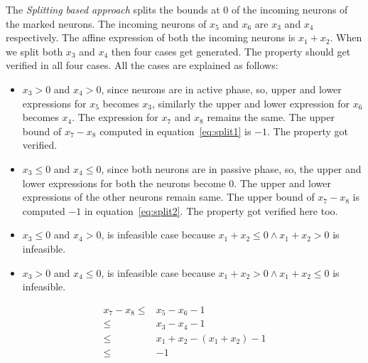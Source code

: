 The {\em Splitting based approach} splits the bounds at $0$ of the incoming neurons of the marked neurons. 
The incoming neurons of $x_5$ and $x_6$ are $x_3$ and $x_4$ respectively. 
The affine expression of both the incoming neurons is $x_1+x_2$. 
When we split both $x_3$ and $x_4$ then four cases get generated. The property should get verified in all four cases. 
All the cases are explained as follows: 
\begin{itemize}
    \item $x_3 > 0$ and $x_4 > 0$, since neurons are in active phase, so, upper and lower expressions for $x_5$ 
    becomes $x_3$, similarly the upper and lower expression for $x_6$ becomes $x_4$. 
    The expression for $x_7$ and $x_8$ remains the same. The upper bound of $x_7 - x_8$ computed in equation~\ref{eq:split1} is $-1$. 
    The property got verified.   
    \item $x_3 \leq 0$ and $x_4 \leq 0$, since both neurons are in passive phase, so, the upper and lower expressions 
        for both the neurons become $0$. The upper and lower expressions of the other neurons remain same. 
        The upper bound of $x_7 - x_8$ is computed $-1$ in equation~\ref{eq:split2}. The property got verified here too. 
    \item $x_3 \leq 0$ and $x_4 > 0$, is infeasible case because $x_1+x_2 \leq 0 \land x_1 + x_2 > 0$ is infeasible. 
    \item $x_3 > 0$ and $x_4 \leq 0$, is infeasible case because $x_1+x_2 > 0 \land x_1 + x_2 \leq 0$ is infeasible. 
\end{itemize}

\begin{equation}
    \begin{aligned}
        x_7 - x_8 \leq & x_5 - x_6 - 1 \\
       \leq & x_3 - x_4 -1 \\
       \leq & x_1 + x_2 -(x_1+x_2) -1 \\
       \leq & -1 
    \end{aligned}
    \label{eq:split1}
\end{equation}

